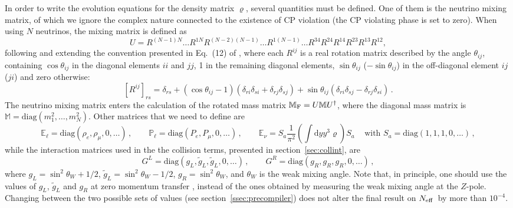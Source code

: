 \documentclass[notitlepage,nofootinbib,showpacs,preprintnumbers,amsmath,amssymb,superscriptaddress,prd,onecolumn]{revtex4-1}
\newcommand{\Neff}{\ensuremath{N_{\rm eff}}}
\begin{document}
In order to write the evolution equations for the density matrix $\varrho$,
several quantities must be defined.
One of them is the neutrino mixing matrix,
of which we ignore the complex nature connected to the existence of CP violation
(the CP violating phase is set to zero).
When using $N$ neutrinos,
the mixing matrix is defined as
%
\begin{equation}\label{eq:mixing_matrix_nxn}
U=R^{(N-1)N} \ldots R^{1N}
R^{(N-2)(N-1)}\ldots R^{1(N-1)}
\ldots
R^{34} R^{24} R^{14} R^{23} R^{13} R^{12},
\end{equation}
%
following and extending the convention presented in Eq.~(12) of \cite{Gariazzo:2015rra},
where each $R^{ij}$ is a real rotation matrix described by the angle $\theta_{ij}$,
containing $\cos\theta_{ij}$ in the diagonal elements $ii$ and $jj$,
1 in the remaining diagonal elements,
$\sin\theta_{ij}$ ($-\sin\theta_{ij}$) in the off-diagonal element $ij$ ($ji$)
and zero otherwise:
\begin{equation}
\label{eq:rotationmatrix}
[R^{ij}]_{rs}=
\delta_{rs}
+
(\cos\theta_{ij}-1)(\delta_{ri}\delta_{si}+\delta_{rj}\delta_{sj})
+
\sin\theta_{ij}(\delta_{ri}\delta_{sj}-\delta_{rj}\delta_{si})\,.
\end{equation}
The neutrino mixing matrix enters the calculation of the rotated mass matrix
$\mathbb{M}_{\rm F}=U\mathbb{M}U^\dagger$,
where the diagonal mass matrix is
$\mathbb{M}=\text{diag}(m_1^2,\ldots,m_N^2)$.
Other matrices that we need to define are
%
\begin{equation}\label{eq:matterpotentials_nxn}
\mathbb{E}_\ell=\text{diag}(\rho_e, \rho_\mu, 0, \ldots)\,,
\qquad
\mathbb{P}_\ell=\text{diag}(P_e, P_\mu, 0, \ldots)\,,
\qquad
\mathbb{E}_\nu=S_a\frac{1}{\pi^2}\left(\int \mathrm{d}y y^3\varrho\right) S_a\,
\quad\mbox{with }S_a=\text{diag}(1,1,1,0,\ldots)\,,
\end{equation}
while the interaction matrices used in the the collision terms,
presented in section~\ref{sec:collint}, are
\begin{equation}
\label{eq:gLR}
G^L=\text{diag}(g_L, \tilde g_L, \tilde g_L, 0,\ldots)\,,
\qquad
G^R=\text{diag}(g_R, g_R, g_R, 0,\ldots)\,,
\end{equation}
%
where $g_L=\sin^2\theta_W+1/2$, $\tilde g_L=\sin^2\theta_W - 1/2$, $g_R=\sin^2\theta_W$,
and $\theta_W$ is the weak mixing angle.
Note that, in principle, one should use the values of $g_L$, $\tilde g_L$ and $g_R$
at zero momentum transfer \cite{Erler:2013xha},
instead of the ones obtained by measuring the weak mixing angle at the $Z$-pole.
Changing between the two possible sets of values (see section~\ref{ssec:precompiler})
does not alter the final result on \Neff\ by more than $10^{-4}$.
\end{document}
